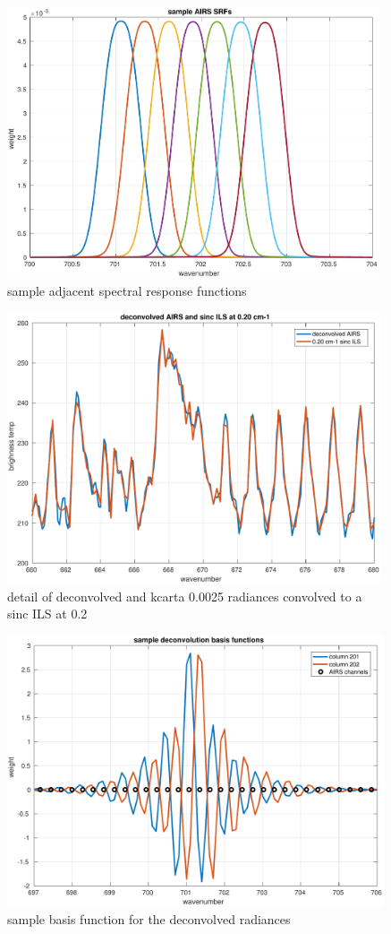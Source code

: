 \documentclass[12pt]{article}
\begin{document}
\begin{figure} %
  \centering
  \includegraphics[height=8cm]{figures/airs_sample_SRFs.pdf}
  \caption{sample adjacent {\airs} spectral response functions}
  \label{srfs1}
\end{figure}

\begin{figure} %
  \centering
  \includegraphics[height=8cm]{figures/airs_decon_res.pdf}
  \caption{detail of deconvolved {\airs} and kcarta 0.0025 {\wn}
    radiances convolved to a sinc ILS at 0.2 {\wn}}
  \label{dsinc}
\end{figure}

\begin{figure} %
  \centering
  \includegraphics[height=8cm]{figures/airs_decon_basis.pdf}
  \caption{sample basis function for the deconvolved {\airs}
    radiances}
  \label{dbasis}
\end{figure}
\end{document}
